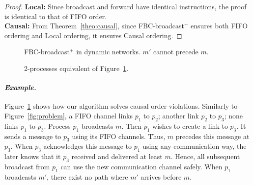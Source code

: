 \begin{proof}
  \textbf{Local:} Since broadcast and forward have identical instructions, the
  proof is identical to that of FIFO order. \\
  \textbf{Causal:} From Theorem~\ref{theo:causal}, since FBC-broadcast$^+$
  ensures both FIFO ordering and Local ordering, it ensures Causal ordering.
\end{proof}

\begin{figure}
  \begin{center}
    
    \caption{\label{fig:solved}FBC-broadcast$^+$ in dynamic networks. $m'$
      cannot precede $m$.}
  \end{center}
\end{figure}

\begin{figure}
  \begin{center}
    
    \caption{\label{fig:eq2solved}2-processes equivalent of Figure~\ref{fig:solved}.}
  \end{center}
\end{figure}

\paragraph{\emph{Example.}} Figure~\ref{fig:solved} shows how our algorithm
solves causal order violations. Similarly to Figure~\ref{fig:problem}, a FIFO
channel links $p_1$ to $p_2$; another link $p_2$ to $p_3$; none links $p_1$ to
$p_3$. Process $p_1$ broadcasts $m$. Then $p_1$ wishes to create a link to
$p_3$. It sends a message to $p_3$ using its FIFO channels. Thus, $m$ precedes
this message at $p_3$. When $p_3$ acknowledges this message to $p_1$ using any
communication way, the later knows that it $p_3$ received and delivered at least
$m$. Hence, all subsequent broadcast from $p_1$ can use the new communication
channel safely. When $p_1$ broadcasts $m'$, there exist no path where $m'$
arrives before $m$.

